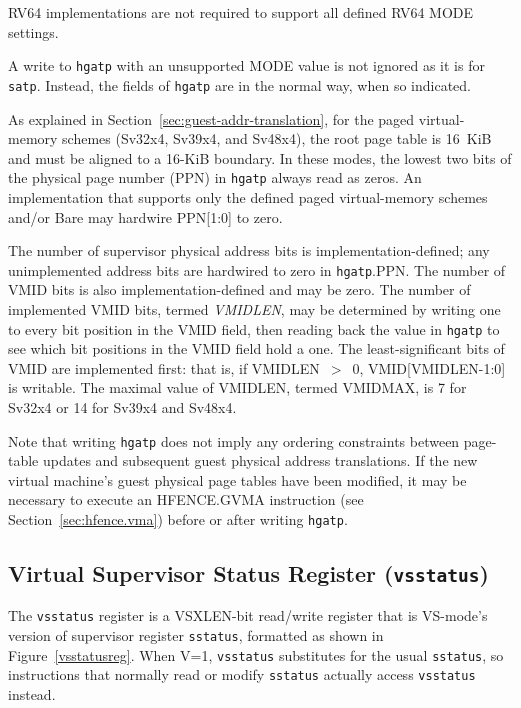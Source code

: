 RV64 implementations are not required to support all defined RV64 MODE
settings.

A write to {\tt hgatp} with an unsupported MODE value is not ignored as it is
for {\tt satp}.
Instead, the fields of {\tt hgatp} are {\warl} in the normal way, when so
indicated.

As explained in Section~\ref{sec:guest-addr-translation}, for the paged
virtual-memory schemes (Sv32x4, Sv39x4, and Sv48x4), the root page table is
16~KiB and must be aligned to a 16-KiB boundary.
In these modes, the lowest two bits of the physical page number (PPN) in
{\tt hgatp} always read as zeros.
An implementation that supports only the defined paged virtual-memory schemes
and/or Bare may hardwire PPN[1:0] to zero.

The number of supervisor physical address bits is implementation-defined; any
unimplemented address bits are hardwired to zero in {\tt hgatp}.PPN.
The number of VMID bits is also implementation-defined and may be zero.
The number of implemented VMID bits, termed {\mbox {\em VMIDLEN}}, may be
determined by writing one to every bit position in the VMID field, then reading
back the value in {\tt hgatp} to see which bit positions in the VMID field hold
a one.
The least-significant bits of VMID are implemented first:
that is, if VMIDLEN~$>$~0, VMID[VMIDLEN-1:0] is writable.
The maximal value of VMIDLEN, termed VMIDMAX, is 7 for Sv32x4 or 14 for Sv39x4
and Sv48x4.

Note that writing {\tt hgatp} does not imply any ordering constraints between
page-table updates and subsequent guest physical address translations.
If the new virtual machine's guest physical page tables have been modified, it
may be necessary to execute an HFENCE.GVMA instruction
(see Section~\ref{sec:hfence.vma}) before or after writing {\tt hgatp}.

\subsection{Virtual Supervisor Status Register ({\tt vsstatus})}

The {\tt vsstatus} register is a VSXLEN-bit read/write register that is
VS-mode's version of supervisor register {\tt sstatus}, formatted as
shown in Figure~\ref{vsstatusreg}.
When V=1, {\tt vsstatus} substitutes for the usual {\tt sstatus}, so
instructions that normally read or modify {\tt sstatus} actually access
{\tt vsstatus} instead.

